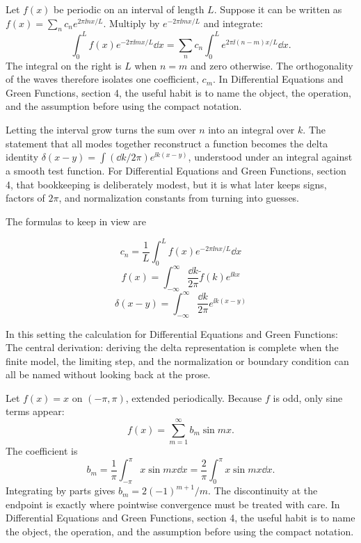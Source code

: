 Let \(f(x)\) be periodic on an interval of length \(L\).  Suppose it can be written as \(f(x)=\sum_n c_ne^{2\pi\ii nx/L}\).  Multiply by \(e^{-2\pi\ii mx/L}\) and integrate:
\[
  \int_0^L f(x)e^{-2\pi\ii mx/L}\dd x
  =
  \sum_n c_n\int_0^L e^{2\pi\ii(n-m)x/L}\dd x.
\]
The integral on the right is \(L\) when \(n=m\) and zero otherwise.  The orthogonality of the waves therefore isolates one coefficient, \(c_m\).  In Differential Equations and Green Functions, section 4, the useful habit is to name the object, the operation, and the assumption before using the compact notation.

Letting the interval grow turns the sum over \(n\) into an integral over \(k\).  The statement that all modes together reconstruct a function becomes the delta identity \(\delta(x-y)=\int(\dd k/2\pi)e^{\ii k(x-y)}\), understood under an integral against a smooth test function.  For Differential Equations and Green Functions, section 4, that bookkeeping is deliberately modest, but it is what later keeps signs, factors of \(2\pi\), and normalization constants from turning into guesses.

The formulas to keep in view are

\[
  c_n=\frac1L\int_0^L f(x)e^{-2\pi\ii nx/L}\dd x
\]
\[
  f(x)=\int_{-\infty}^{\infty}\frac{\dd k}{2\pi}\tilde f(k)e^{\ii kx}
\]
\[
  \delta(x-y)=\int_{-\infty}^{\infty}\frac{\dd k}{2\pi}e^{\ii k(x-y)}
\]

In this setting the calculation for Differential Equations and Green Functions: The central derivation: deriving the delta representation is complete when the finite model, the limiting step, and the normalization or boundary condition can all be named without looking back at the prose.




\begin{example}
Let \(f(x)=x\) on \((-\pi,\pi)\), extended periodically.  Because \(f\) is odd, only sine terms appear:
\[
  f(x)=\sum_{m=1}^\infty b_m\sin mx.
\]
The coefficient is
\[
  b_m=\frac1\pi\int_{-\pi}^\pi x\sin mx\dd x
  =\frac2\pi\int_0^\pi x\sin mx\dd x.
\]
Integrating by parts gives \(b_m=2(-1)^{m+1}/m\).  The discontinuity at the endpoint is exactly where pointwise convergence must be treated with care.  In Differential Equations and Green Functions, section 4, the useful habit is to name the object, the operation, and the assumption before using the compact notation.
\end{example}



